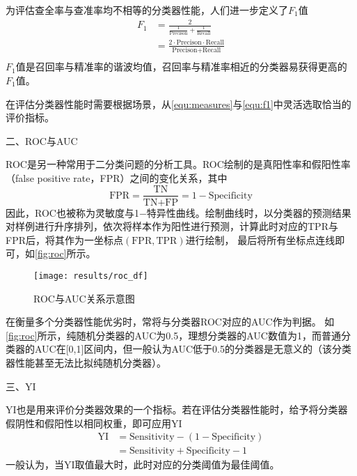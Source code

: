为评估查全率与查准率均不相等的分类器性能，人们进一步定义了$F_1$值
\begin{equation}
    \label{equ:f1}
    \begin{aligned}
        F_1   &= \frac{2}{\frac{1}{\text{Precison}}+\frac{1}{\text{Recall}}}         \\
                &=\frac{2\cdot \text{Precison}\cdot \text{Recall}}{\text{Precison+Recall}}          \\
    \end{aligned}
\end{equation}
$F_1$值是召回率与精准率的谐波均值，召回率与精准率相近的分类器易获得更高的$F_1$值。

在评估分类器性能时需要根据场景，从\autoref{equ:measures}与\autoref{equ:f1}中灵活选取恰当的评价指标。

二、ROC与AUC

ROC是另一种常用于二分类问题的分析工具。ROC绘制的是真阳性率和假阳性率（false positive rate，FPR）之间的变化关系，其中
\begin{equation}
    \label{equ:fpr}
    \text{FPR}=\frac{\text{TN}}{\text{TN+FP}}=1-\text{Specificity}
\end{equation}
因此，ROC也被称为灵敏度与1$-$特异性曲线。绘制曲线时，以分类器的预测结果对样例进行升序排列，依次将样本作为阳性进行预测，计算此时对应的TPR与FPR后，将其作为一坐标点$(\text{FPR},\text{TPR})$进行绘制，
最后将所有坐标点连线即可，如\autoref{fig:roc}所示。
\begin{figure}[htbp]
    \centering
    \texttt{[image: results/roc\_df]}
    \caption[ROC曲线与AUC关系示意图]{\label{fig:roc}ROC与AUC关系示意图}
\end{figure}

在衡量多个分类器性能优劣时，常将与分类器ROC对应的AUC作为判据。
如\autoref{fig:roc}所示，纯随机分类器的AUC为0.5，理想分类器的AUC数值为1，而普通分类器的AUC在[0,1]区间内，但一般认为AUC低于0.5的分类器是无意义的（该分类器性能甚至无法比拟纯随机分类器）\cite{Aurélien2018}。

三、YI

YI也是用来评价分类器效果的一个指标。若在评估分类器性能时，给予将分类器假阴性和假阳性以相同权重，即可应用YI
\begin{equation}
    \label{equ:yi}
    \begin{aligned}
        \text{YI}&=\text{Sensitivity}-(1-\text{Specificity})\\
        &=\text{Sensitivity}+\text{Specificity}-1
    \end{aligned}
\end{equation}
一般认为，当YI取值最大时，此时对应的分类阈值为最佳阈值\cite{cwl}。

